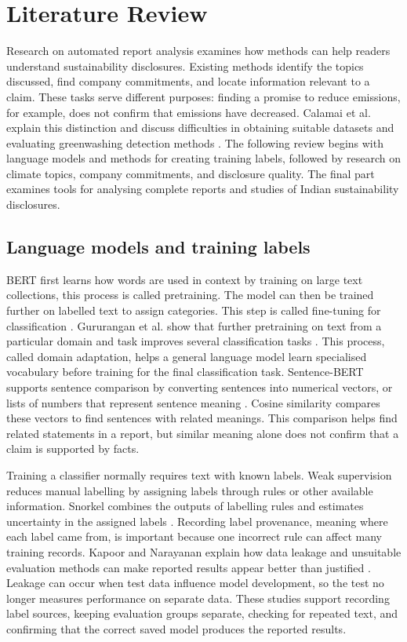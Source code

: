 \section{Literature Review}
\label{sec:literature}

Research on automated report analysis examines how methods can help readers understand sustainability disclosures. Existing methods identify the topics discussed, find company commitments, and locate information relevant to a claim. These tasks serve different purposes: finding a promise to reduce emissions, for example, does not confirm that emissions have decreased. Calamai et al. explain this distinction and discuss difficulties in obtaining suitable datasets and evaluating greenwashing detection methods \cite{calamai2025}. The following review begins with language models and methods for creating training labels, followed by research on climate topics, company commitments, and disclosure quality. The final part examines tools for analysing complete reports and studies of Indian sustainability disclosures.

\subsection{Language models and training labels}

BERT first learns how words are used in context by training on large text collections, this process is called pretraining. The model can then be trained further on labelled text to assign categories. This step is called fine-tuning for classification \cite{devlin2019}. Gururangan et al. show that further pretraining on text from a particular domain and task improves several classification tasks \cite{gururangan2020}. This process, called domain adaptation, helps a general language model learn specialised vocabulary before training for the final classification task. Sentence-BERT supports sentence comparison by converting sentences into numerical vectors, or lists of numbers that represent sentence meaning \cite{reimers2019}. Cosine similarity compares these vectors to find sentences with related meanings. This comparison helps find related statements in a report, but similar meaning alone does not confirm that a claim is supported by facts.

Training a classifier normally requires text with known labels. Weak supervision reduces manual labelling by assigning labels through rules or other available information. Snorkel combines the outputs of labelling rules and estimates uncertainty in the assigned labels \cite{ratner2017}. Recording label provenance, meaning where each label came from, is important because one incorrect rule can affect many training records. Kapoor and Narayanan explain how data leakage and unsuitable evaluation methods can make reported results appear better than justified \cite{kapoor2023}. Leakage can occur when test data influence model development, so the test no longer measures performance on separate data. These studies support recording label sources, keeping evaluation groups separate, checking for repeated text, and confirming that the correct saved model produces the reported results.

